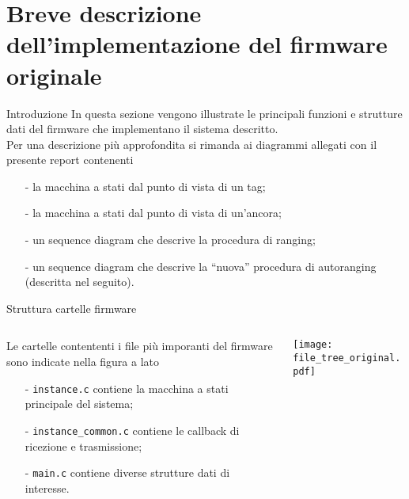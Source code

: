 \section{Breve descrizione dell'implementazione del firmware originale}

\begin{frame}{Introduzione}
  In questa sezione vengono illustrate le principali funzioni e strutture dati
  del firmware che implementano il sistema descritto.\\
  Per una descrizione più approfondita si rimanda ai diagrammi allegati con il presente
  report contenenti
  \begin{itemize}
  \item[-] la macchina a stati dal punto di vista di un tag;
  \item[-] la macchina a stati dal punto di vista di un'ancora;
  \item[-] un sequence diagram che descrive la procedura di ranging;
  \item[-] un sequence diagram che descrive la ``nuova'' procedura di autoranging
    (descritta nel seguito).
  \end{itemize}
\end{frame}

\begin{frame}{Struttura cartelle firmware}
  \begin{columns}
    \begin{column}{0.6\textwidth}
      Le cartelle contententi i file più imporanti del firmware sono indicate nella figura a lato\\
      \begin{itemize}
      \item[-] \lstinline!instance.c! contiene la macchina a stati principale del sistema;
      \item[-] \lstinline!instance_common.c! contiene le \alert{callback} di ricezione e trasmissione;
      \item[-] \lstinline!main.c! contiene diverse strutture dati di interesse.
      \end{itemize}
    \end{column}
    \begin{column}{0.3\textwidth}
      \centering
      \texttt{[image: file\_tree\_original.pdf]}
    \end{column}
  \end{columns}
\end{frame}

